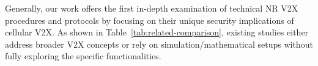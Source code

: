 Generally, our work offers the first in-depth examination of technical NR V2X procedures and protocols by focusing on their unique security implications of cellular V2X. As shown in Table~\ref{tab:related-comparison}, existing studies either address broader V2X concepts or rely on simulation/mathematical setups without fully exploring the specific functionalities.